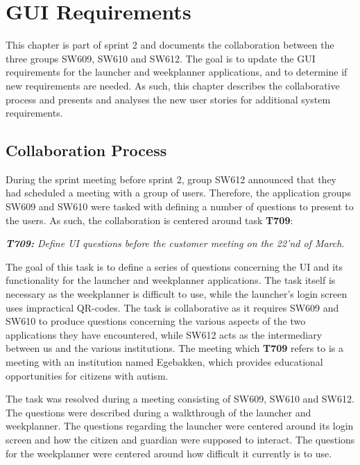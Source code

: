 \chapter{GUI Requirements}\label{sec:Colab2}
This chapter is part of sprint 2 and documents the collaboration between the
three groups SW609, SW610 and SW612. The goal is to update the GUI requirements
for the launcher and weekplanner applications, and to determine if new
requirements are needed. As such, this chapter describes the collaborative
process and presents and analyses the new user stories for additional system
requirements.

\section{Collaboration Process}
During the sprint meeting before sprint 2, group SW612 announced that they had
scheduled a meeting with a group of users. Therefore, the application groups
SW609 and SW610 were tasked with defining a number of questions to present to
the users. As such, the collaboration is centered around task \textbf{T709}:\nl

\textit{\textbf{T709:} Define UI questions before the customer meeting on the
22'nd of March}.\nl 

The goal of this task is to define a series of questions concerning
the UI and its functionality for the launcher and weekplanner applications. The task itself is necessary as the
weekplanner is difficult to use, while the launcher's login screen uses 
impractical QR-codes. The task is collaborative as it requires SW609 and SW610
to produce questions concerning the various aspects of the two applications they have
encountered, while SW612 acts as the intermediary between us and the various
institutions. The meeting which \textbf{T709} refers to is a meeting with an
institution named Egebakken, which provides educational opportunities for
citizens with autism.\nl

The task was resolved during a meeting consisting of SW609, SW610 and SW612.
The questions were described during a walkthrough of the launcher and
weekplanner. The questions regarding the launcher were centered around its
login screen and how the citizen and guardian were supposed to interact. The
questions for the weekplanner were centered around how difficult it currently
is to use.\nl

